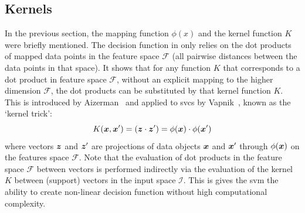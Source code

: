 
\subsection{Kernels}\label{subsec:kernels}
In the previous section, the mapping function $\phi(x)$ and the kernel function $K$ were briefly mentioned.
The decision function in  only relies on the dot products of mapped data points in the feature space $\mathcal{F}$ (\ie all pairwise distances between the data points in that space).
It shows \cite{flach2012machine} that for any function $K$ that corresponds to a dot product in feature space $\mathcal{F}$, without an explicit mapping to the higher dimension $\mathcal{F}$, the dot products can be substituted by that kernel function $K$.
This is introduced by Aizerman~\etal \cite{aizerman1964theoretical} and applied to \glspl{svc} by Vapnik~\cite{vapnik1998statistical}, known as the `kernel trick':
\begin{equation}
  K(\vectorsym{x}, \vectorsym{x}') = (\vectorsym{z} \cdot \vectorsym{z}') = \phi(\vectorsym{x}) \cdot \phi(\vectorsym{x}')
\end{equation}
where vectors $\vectorsym{z}$ and $\vectorsym{z}'$ are projections of data objects $\vectorsym{x}$ and $\vectorsym{x}'$ through $\phi(\vectorsym{x})$ on the features space $\mathcal{F}$.
Note that the evaluation of dot products in the feature space $\mathcal{F}$ between vectors is performed indirectly via the evaluation of the kernel $K$ between (support) vectors in the input space $\mathcal{I}$.
This is gives the \gls{svm} the ability to create non-linear decision function without high computational complexity.

